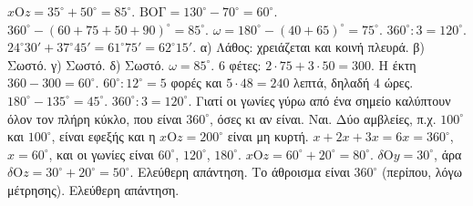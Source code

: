  $x\mathrm{Ο}z=35^\circ+50^\circ=85^\circ$.
 $\mathrm{ΒΟΓ}=130^\circ-70^\circ=60^\circ$.
 $360^\circ-(60+75+50+90)^\circ=85^\circ$.
 $\omega=180^\circ-(40+65)^\circ=75^\circ$.
 $360^\circ:3=120^\circ$.
 $24^\circ30'+37^\circ45'=61^\circ75'=62^\circ15'$.
 α) Λάθος: χρειάζεται και κοινή πλευρά. β) Σωστό. γ) Σωστό. δ) Σωστό.
 $\omega=85^\circ$.
 $6$ φέτες: $2\cdot75+3\cdot50=300$. Η έκτη $360-300=60^\circ$.
 $60^\circ:12^\circ=5$ φορές και $5\cdot48=240$ λεπτά, δηλαδή $4$ ώρες.
 $180^\circ-135^\circ=45^\circ$.
 $360^\circ:3=120^\circ$.
 Γιατί οι γωνίες γύρω από ένα σημείο καλύπτουν όλον τον πλήρη κύκλο, που είναι $360^\circ$, όσες κι αν είναι.
 Ναι. Δύο αμβλείες, π.χ. $100^\circ$ και $100^\circ$, είναι εφεξής και η $x\mathrm{Ο}z=200^\circ$ είναι μη κυρτή.
 $x+2x+3x=6x=360^\circ$, $x=60^\circ$, και οι γωνίες είναι $60^\circ$, $120^\circ$, $180^\circ$.
 $x\mathrm{Ο}z=60^\circ+20^\circ=80^\circ$. $\delta\mathrm{Ο}y=30^\circ$, άρα $\delta\mathrm{Ο}z=30^\circ+20^\circ=50^\circ$.
 Ελεύθερη απάντηση. Το άθροισμα είναι $360^\circ$ (περίπου, λόγω μέτρησης).
 Ελεύθερη απάντηση.
